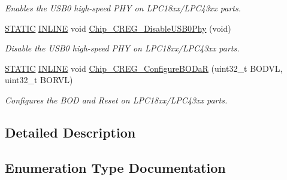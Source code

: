 \begin{DoxyCompactItemize}
\begin{DoxyCompactList}\small\item\em Enables the U\+S\+B0 high-\/speed P\+HY on L\+P\+C18xx/\+L\+P\+C43xx parts. \end{DoxyCompactList}\item 
\hyperlink{group___l_p_c___types___public___macros_ga10b2d890d871e1489bb02b7e70d9bdfb}{S\+T\+A\+T\+IC} \hyperlink{spifi__18xx__43xx_8h_a2eb6f9e0395b47b8d5e3eeae4fe0c116}{I\+N\+L\+I\+NE} void \hyperlink{group___c_r_e_g__18_x_x__43_x_x_ga604f1e681ee7fcd16b9fe57c12e3e135}{Chip\+\_\+\+C\+R\+E\+G\+\_\+\+Disable\+U\+S\+B0\+Phy} (void)
\begin{DoxyCompactList}\small\item\em Disable the U\+S\+B0 high-\/speed P\+HY on L\+P\+C18xx/\+L\+P\+C43xx parts. \end{DoxyCompactList}\item 
\hyperlink{group___l_p_c___types___public___macros_ga10b2d890d871e1489bb02b7e70d9bdfb}{S\+T\+A\+T\+IC} \hyperlink{spifi__18xx__43xx_8h_a2eb6f9e0395b47b8d5e3eeae4fe0c116}{I\+N\+L\+I\+NE} void \hyperlink{group___c_r_e_g__18_x_x__43_x_x_ga060a0c5a349e123114449c22e91b495f}{Chip\+\_\+\+C\+R\+E\+G\+\_\+\+Configure\+B\+O\+DaR} (uint32\+\_\+t B\+O\+D\+VL, uint32\+\_\+t B\+O\+R\+VL)
\begin{DoxyCompactList}\small\item\em Configures the B\+OD and Reset on L\+P\+C18xx/\+L\+P\+C43xx parts. \end{DoxyCompactList}\end{DoxyCompactItemize}


\subsection{Detailed Description}


\subsection{Enumeration Type Documentation}
\mbox{\label{group___c_r_e_g__18_x_x__43_x_x_gaecbf266e1dc43b19d1cca3b7cc800786}} 
